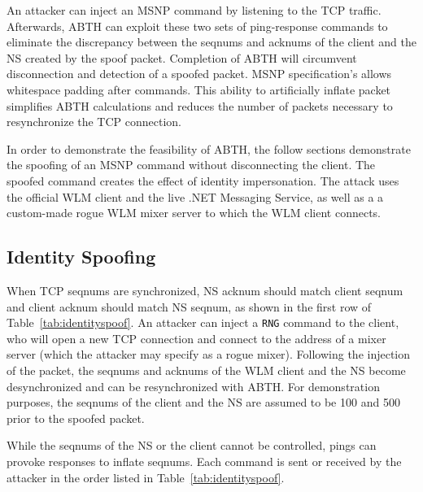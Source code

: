 \documentclass{sig-alternate}
\begin{document}
An attacker can inject an MSNP command by listening to the TCP traffic.
Afterwards, ABTH can exploit these two sets of ping-response commands to eliminate the discrepancy between the seqnums and acknums of the client and the NS created by the spoof packet.
Completion of ABTH will circumvent disconnection and detection of a spoofed packet.
MSNP specification's allows whitespace padding after commands.
This ability to artificially inflate packet simplifies ABTH calculations and reduces the number of packets necessary to resynchronize the TCP connection.

In order to demonstrate the feasibility of ABTH, the follow sections demonstrate the spoofing of an MSNP command without disconnecting the client.
The spoofed command creates the effect of identity impersonation.
The attack uses the official WLM client and the live .NET Messaging Service, as well as a a custom-made rogue WLM mixer server to which the WLM client connects.

\subsection{Identity Spoofing}

When TCP seqnums are synchronized, NS acknum should match client seqnum and client acknum should match NS seqnum, as shown in the first row of Table~\ref{tab:identityspoof}.
An attacker can inject a \texttt{RNG} command to the client, who will open a new TCP connection and connect to the address of a mixer server (which the attacker may specify as a rogue mixer).
Following the injection of the packet, the seqnums and acknums of the WLM client and the NS become desynchronized and can be resynchronized with ABTH.
For demonstration purposes, the seqnums of the client and the NS are assumed to be 100 and 500 prior to the spoofed packet.

While the seqnums of the NS or the client cannot be controlled, pings can provoke responses to inflate seqnums.
Each command is sent or received by the attacker in the order listed in Table~\ref{tab:identityspoof}.
\end{document}
